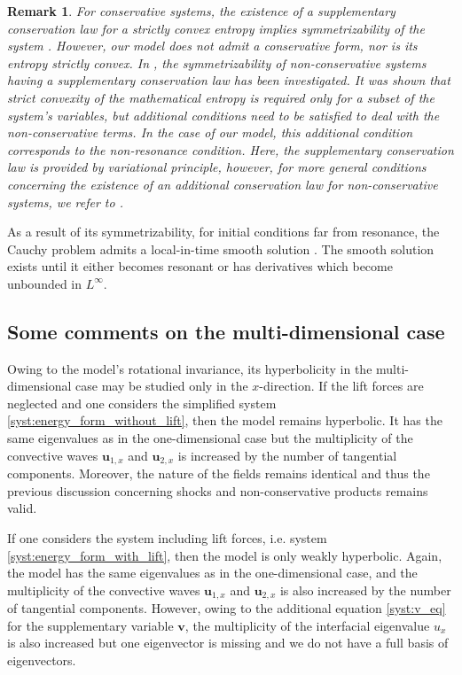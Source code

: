 \documentclass{myclass}
\newtheorem{remark}{\bf Remark}[section]
\newcommand{\vel}{\bm{u}}
\begin{document}
\begin{remark}
For conservative systems, the existence of a supplementary conservation law for a strictly convex entropy implies symmetrizability of the system \cite{godunov:2025,friedrichs:1971}. However, our model does not admit a conservative form, nor is its entropy strictly convex. In \cite{forestier:2011}, the symmetrizability of non-conservative systems having a supplementary conservation law has been investigated.  It was shown that strict convexity of the mathematical entropy is required only for a subset of the system's variables, but additional conditions need to be satisfied to deal with the non-conservative terms. In the case of our model, this additional condition corresponds to the non-resonance condition. Here, the supplementary conservation law is provided by variational principle, however, for more general conditions concerning the existence of an additional conservation law for non-conservative systems, we refer to \cite{cordesse:2020}.
\end{remark}

As a result of its symmetrizability, for initial conditions far from resonance, the Cauchy problem admits a local-in-time smooth solution \cite{kato:1975}. The smooth solution exists until it either becomes resonant or has derivatives which become unbounded in $L^\infty$.


\subsection{Some comments on the multi-dimensional case}

Owing to the model's rotational invariance, its hyperbolicity in the multi-dimensional case may be studied only in the $x$-direction. If the lift forces are neglected and one considers the simplified system \eqref{syst:energy_form_without_lift}, then the model remains hyperbolic. It has the same eigenvalues as in the one-dimensional case but the multiplicity of the convective waves $\vel_{1,x}$ and $\vel_{2,x}$ is increased by the number of tangential components. Moreover, the nature of the fields remains identical and thus the previous discussion concerning shocks and non-conservative products remains valid.

If one considers the system including lift forces, i.e. system \eqref{syst:energy_form_with_lift}, then the model is only weakly hyperbolic. Again, the model has the same eigenvalues as in the one-dimensional case, and the multiplicity of the convective waves $\vel_{1,x}$ and $\vel_{2,x}$ is also increased by the number of tangential components. However, owing to the additional equation \eqref{syst:v_eq} for the supplementary variable $\bm{v}$, the multiplicity of the interfacial eigenvalue $u_x$ is also increased but one eigenvector is missing and we do not have a full basis of eigenvectors. 
\end{document}
